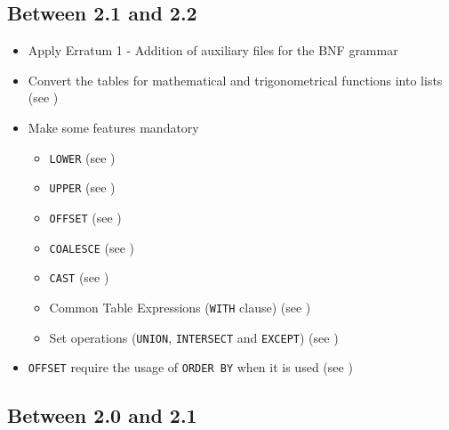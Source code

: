 \documentclass[11pt,a4paper]{ivoa}
\begin{document}
\subsection{Between 2.1 and 2.2}
\label{sec:changes-2.2}

\begin{itemize}
    \item Apply Erratum 1 - Addition of auxiliary files for the BNF grammar
    \item Convert the tables for mathematical and trigonometrical
          functions into lists (see )
    \item Make some features mandatory
        \begin{itemize}
            \item \texttt{LOWER} (see )
            \item \texttt{UPPER} (see )
            \item \texttt{OFFSET} (see )
            \item \texttt{COALESCE} (see )
            \item \texttt{CAST} (see )
            \item Common Table Expressions (\texttt{WITH} clause)
                  (see )
            \item Set operations (\texttt{UNION}, \texttt{INTERSECT} and
                  \texttt{EXCEPT}) (see )
        \end{itemize}
    \item \texttt{OFFSET} require the usage of \texttt{ORDER BY} when it is used
          (see )
\end{itemize}

\subsection{Between 2.0 and 2.1}
\label{sec:changes-2.1}
\end{document}
